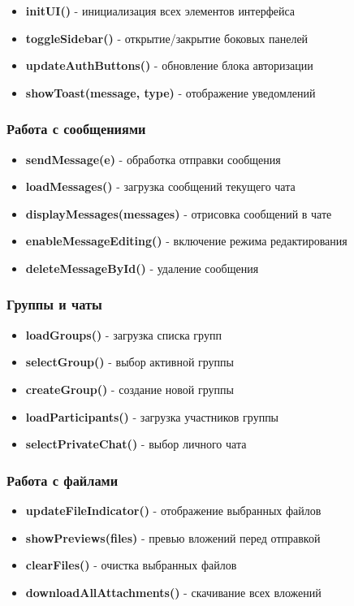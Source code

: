 \begin{itemize}
	\item \textbf{initUI()} - инициализация всех элементов интерфейса
	\item \textbf{toggleSidebar()} - открытие/закрытие боковых панелей
	\item \textbf{updateAuthButtons()} - обновление блока авторизации
	\item \textbf{showToast(message, type)} - отображение уведомлений
\end{itemize}

\subsubsection{Работа с сообщениями}

\begin{itemize}
	\item \textbf{sendMessage(e)} - обработка отправки сообщения
	\item \textbf{loadMessages()} - загрузка сообщений текущего чата
	\item \textbf{displayMessages(messages)} - отрисовка сообщений в чате
	\item \textbf{enableMessageEditing()} - включение режима редактирования
	\item \textbf{deleteMessageById()} - удаление сообщения
\end{itemize}

\subsubsection{Группы и чаты}

\begin{itemize}
	\item \textbf{loadGroups()} - загрузка списка групп
	\item \textbf{selectGroup()} - выбор активной группы
	\item \textbf{createGroup()} - создание новой группы
	\item \textbf{loadParticipants()} - загрузка участников группы
	\item \textbf{selectPrivateChat()} - выбор личного чата
\end{itemize}

\subsubsection{Работа с файлами}

\begin{itemize}
	\item \textbf{updateFileIndicator()} - отображение выбранных файлов
	\item \textbf{showPreviews(files)} - превью вложений перед отправкой
	\item \textbf{clearFiles()} - очистка выбранных файлов
	\item \textbf{downloadAllAttachments()} - скачивание всех вложений
\end{itemize}

